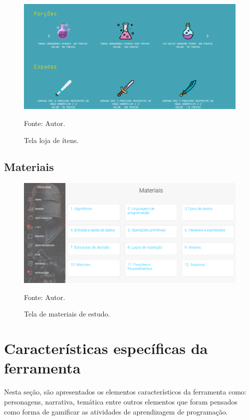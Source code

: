 \subsection{}
\begin{figure}[h]
	\centering
	\includegraphics[keepaspectratio=true,scale=0.32]{figuras/k.png}
	\caption{Tela loja de ítens.}
	Fonte: Autor.
	\label{figurak}
\end{figure}

\subsection{Materiais}
\begin{figure}[h]
	\centering
	\includegraphics[keepaspectratio=true,scale=0.32]{figuras/l.png}
	\caption{Tela de materiais de estudo.}
	Fonte: Autor.
	\label{figural}
\end{figure}

\pagebreak


\section{Características específicas da ferramenta}

Nesta seção, são apresentados os elementos característicos da ferramenta como: personagens, narrativa, temática entre outros 
elementos que foram pensados como forma de gamificar as atividades de aprendizagem de programação.

